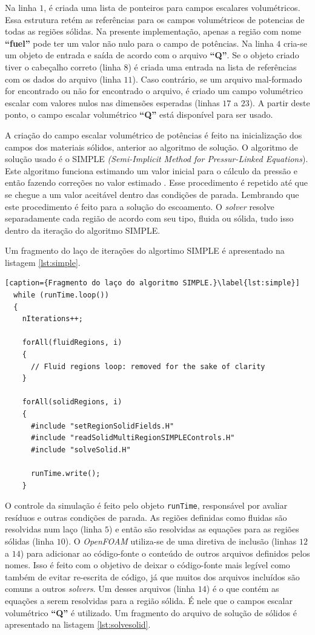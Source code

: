 Na linha $1$, é criada uma lista de ponteiros para campos escalares volumétricos. Essa estrutura
retém as referências para os campos volumétricos de potencias de todas as regiões sólidas. Na
presente implementação, apenas a região com nome \textbf{``fuel''} pode ter um valor não nulo
para o campo de potências. Na linha $4$ cria-se um objeto de entrada e saída de acordo com o
arquivo \textbf{``Q''}. Se o
objeto criado tiver o cabeçalho correto (linha $8$) é criada uma entrada na lista de referências com os
dados do arquivo (linha $11$). Caso contrário, se um arquivo mal-formado for encontrado ou
não for encontrado o arquivo, é criado um campo volumétrico escalar com valores nulos nas dimensões
esperadas (linhas $17$ a $23$). A partir deste ponto, o campo escalar volumétrico \textbf{``Q''}
está disponível para ser usado.

A criação do campo escalar volumétrico de potências é feito na inicialização dos campos dos materiais
sólidos, anterior ao algoritmo de solução. O algoritmo de solução usado é o SIMPLE
\textit{(Semi-Implicit Method for Pressur-Linked Equations}). Este algoritmo funciona
estimando um valor inicial para o cálculo da pressão e então fazendo correções no valor
estimado \cite{Versteeg2007}. Esse procedimento é repetido até que se chegue a um valor
aceitável dentro das condições de parada. Lembrando que este procedimento é feito para
a solução do escoamento. O \textit{solver} resolve separadamente cada região de acordo com seu
tipo, fluida ou sólida, tudo isso dentro da iteração do algoritmo SIMPLE.

Um fragmento do laço de iterações do algortimo SIMPLE é apresentado na listagem \ref{lst:simple}.

\begin{lstlisting}[caption={Fragmento do laço do algoritmo SIMPLE.}\label{lst:simple}]
  while (runTime.loop())
  {
    nIterations++;

    forAll(fluidRegions, i)
    {
      // Fluid regions loop: removed for the sake of clarity
    }
    
    forAll(solidRegions, i)
    {
      #include "setRegionSolidFields.H"
      #include "readSolidMultiRegionSIMPLEControls.H"
      #include "solveSolid.H"
      
      runTime.write();
    }
\end{lstlisting}

O controle da simulação é feito pelo objeto \texttt{runTime}, responsável por avaliar resíduos
e outras condições de parada. As regiões definidas como fluidas são resolvidas num laço (linha $5$)
e então são resolvidas as equações para as regiões sólidas (linha $10$). O \textit{OpenFOAM} utiliza-se
de uma diretiva de inclusão (linhas $12$ a $14$) para adicionar ao código-fonte o conteúdo de outros
arquivos definidos pelos nomes. Isso é feito com o objetivo de deixar o código-fonte mais legível como
também de evitar re-escrita de código, já que muitos dos arquivos incluídos são comuns a outros
\textit{solvers}. Um desses arquivos (linha $14$) é o que contém as equações a serem resolvidas para
a região sólida. É nele que o campos escalar volumétrico \textbf{``Q''} é utilizado. Um fragmento
do arquivo de solução de sólidos é apresentado na listagem \ref{lst:solvesolid}.

